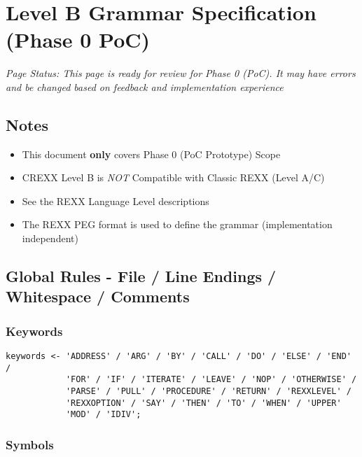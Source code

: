 \section{Level B Grammar Specification (Phase 0 PoC)}

\emph{Page Status: This page is ready for review for Phase 0 (PoC). It may have errors
and be changed based on feedback and implementation experience}

\subsection{Notes}

\begin{itemize}
\item This document \textbf{only} covers Phase 0 (PoC Prototype) Scope

\item CREXX Level B is \emph{NOT} Compatible with Classic REXX (Level A/C)

\item See {the REXX Language Level} descriptions

\item The {REXX PEG format} is used to define the grammar (implementation independent)

\end{itemize}

\subsection{Global Rules - File / Line Endings / Whitespace / Comments}

\subsubsection{Keywords}

\begin{verbatim}
keywords <- 'ADDRESS' / 'ARG' / 'BY' / 'CALL' / 'DO' / 'ELSE' / 'END' /
            'FOR' / 'IF' / 'ITERATE' / 'LEAVE' / 'NOP' / 'OTHERWISE' /
            'PARSE' / 'PULL' / 'PROCEDURE' / 'RETURN' / 'REXXLEVEL' /
            'REXXOPTION' / 'SAY' / 'THEN' / 'TO' / 'WHEN' / 'UPPER' 
            'MOD' / 'IDIV';
\end{verbatim}

\subsubsection{Symbols}

